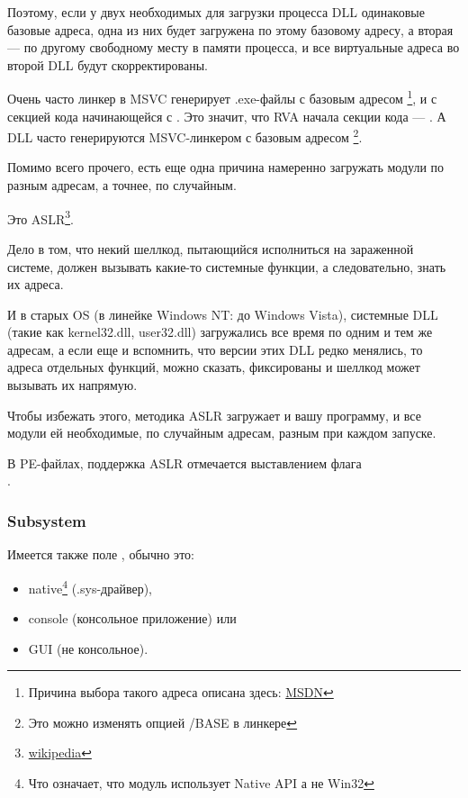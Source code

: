 Поэтому, если у двух необходимых для загрузки процесса DLL одинаковые базовые адреса,
одна из них будет загружена по этому базовому адресу, 
а вторая --- по другому свободному месту в памяти процесса, и все виртуальные адреса во второй DLL будут скорректированы.

\par Очень часто линкер в \ac{MSVC} генерирует .exe-файлы с базовым адресом  \footnote{Причина выбора такого адреса описана здесь: \href{http://go.yurichev.com/17041}{MSDN}},
и с секцией кода начинающейся с .
Это значит, что \ac{RVA} начала секции кода --- .
А \ac{DLL} часто генерируются MSVC-линкером с базовым адресом \footnote{Это можно изменять опцией /BASE в линкере}.

Помимо всего прочего, есть еще одна причина намеренно загружать модули по разным адресам, а точнее, по случайным.

Это \ac{ASLR}\footnote{\href{http://go.yurichev.com/17042}{wikipedia}}.

Дело в том, что некий шеллкод, пытающийся исполниться на зараженной системе, должен вызывать какие-то системные функции, а следовательно, знать их адреса.

И в старых \ac{OS} (в линейке \gls{Windows NT}: до Windows Vista),
системные DLL (такие как kernel32.dll, user32.dll) загружались все время
по одним и тем же адресам, 
а если еще и вспомнить, что версии этих DLL редко менялись, то адреса отдельных
функций, можно сказать, фиксированы и шеллкод может вызывать их напрямую.

Чтобы избежать этого, методика \ac{ASLR}
загружает и вашу программу, и все модули ей необходимые, по случайным адресам, разным при каждом запуске.

В PE-файлах, поддержка \ac{ASLR} отмечается выставлением флага \\
 .

\subsubsection{Subsystem}

Имеется также поле , обычно это:

\begin{itemize}
\item native\footnote{Что означает, что модуль использует Native API а не Win32} (.sys-драйвер), 

\item console (консольное приложение) или

\item \ac{GUI} (не консольное).
\end{itemize}

